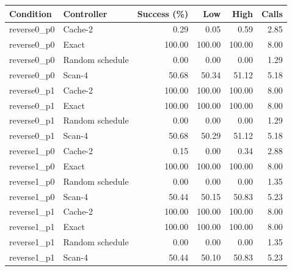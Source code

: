 \begin{longtable}{llrrrr}
\toprule
Condition & Controller & Success (\%) & Low & High & Calls\\
\midrule
\endhead
reverse0\_p0 & Cache-2 & 0.29 & 0.05 & 0.59 & 2.85\\
reverse0\_p0 & Exact & 100.00 & 100.00 & 100.00 & 8.00\\
reverse0\_p0 & Random schedule & 0.00 & 0.00 & 0.00 & 1.29\\
reverse0\_p0 & Scan-4 & 50.68 & 50.34 & 51.12 & 5.18\\
reverse0\_p1 & Cache-2 & 100.00 & 100.00 & 100.00 & 8.00\\
reverse0\_p1 & Exact & 100.00 & 100.00 & 100.00 & 8.00\\
reverse0\_p1 & Random schedule & 0.00 & 0.00 & 0.00 & 1.29\\
reverse0\_p1 & Scan-4 & 50.68 & 50.29 & 51.12 & 5.18\\
reverse1\_p0 & Cache-2 & 0.15 & 0.00 & 0.34 & 2.88\\
reverse1\_p0 & Exact & 100.00 & 100.00 & 100.00 & 8.00\\
reverse1\_p0 & Random schedule & 0.00 & 0.00 & 0.00 & 1.35\\
reverse1\_p0 & Scan-4 & 50.44 & 50.15 & 50.83 & 5.23\\
reverse1\_p1 & Cache-2 & 100.00 & 100.00 & 100.00 & 8.00\\
reverse1\_p1 & Exact & 100.00 & 100.00 & 100.00 & 8.00\\
reverse1\_p1 & Random schedule & 0.00 & 0.00 & 0.00 & 1.35\\
reverse1\_p1 & Scan-4 & 50.44 & 50.10 & 50.83 & 5.23\\
\bottomrule
\end{longtable}